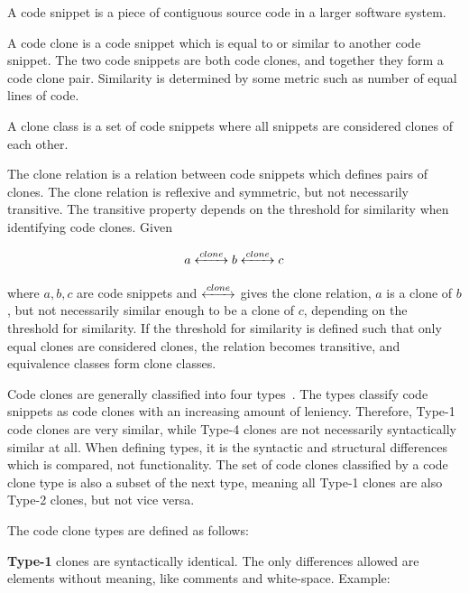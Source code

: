 \begin{definition}
	A code snippet is a piece of contiguous source code in a larger software system.
\end{definition}

\begin{definition}
	A code clone is a code snippet which is equal to or similar to another code snippet. The two
	code snippets are both code clones, and together they form a code clone pair.
	Similarity is determined by some metric such as number of equal lines of code.
\end{definition}

\begin{definition}
	A clone class is a set of code snippets where all snippets are considered clones of each
	other.
\end{definition}


The clone relation is a relation between code snippets which defines pairs of clones.
The clone relation is reflexive and symmetric, but not necessarily transitive. The transitive
property depends on the threshold for similarity when identifying code clones. Given

$$a \xleftrightarrow{clone} b \xleftrightarrow{clone} c$$


where $a,b,c$ are code snippets and $\xleftrightarrow{clone}$ gives the clone relation,
$a$ is a clone of $b$, but not necessarily similar enough to be a clone of $c$, depending
on the threshold for similarity. If the threshold for similarity is defined such that only
equal clones are considered clones, the relation becomes transitive, and equivalence
classes form clone classes.

Code clones are generally classified into four types~\cite{Inoue_introduction_to_cc}. The
types classify code snippets as code clones with an increasing amount of leniency.
Therefore, Type-1 code clones are very similar, while Type-4 clones are not necessarily
syntactically similar at all. When defining types, it is the syntactic and structural
differences which is compared, not functionality. The set of code clones classified by a
code clone type is also a subset of the next type, meaning all Type-1 clones are also
Type-2 clones, but not vice versa.

The code clone types are defined as follows:

\textbf{Type-1} clones are syntactically identical. The only differences allowed are elements
without meaning, like comments and white-space. Example:

